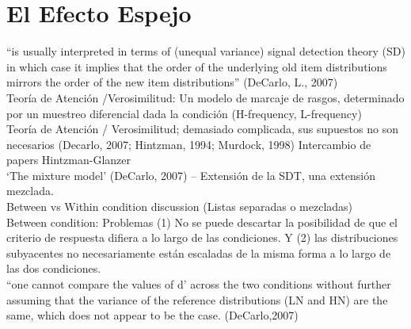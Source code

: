 
\section{El Efecto Espejo}

“is usually interpreted in terms of (unequal variance) signal detection theory (SD) in which case it implies that the order of the underlying old item distributions mirrors the order of the new item distributions” (DeCarlo, L.,  2007)\\
Teoría de Atención /Verosimilitud: Un modelo de marcaje de rasgos, determinado por un muestreo diferencial dada la condición (H-frequency, L-frequency)\\
Teoría de Atención / Verosimilitud; demasiado complicada, sus supuestos no son necesarios (Decarlo, 2007; Hintzman, 1994; Murdock, 1998) Intercambio de papers Hintzman-Glanzer\\
‘The mixture model’ (DeCarlo, 2007) – Extensión de la SDT, una extensión mezclada.\\
Between vs Within condition discussion (Listas separadas o mezcladas)\\
Between condition: Problemas (1) No se puede descartar la posibilidad de que el criterio de respuesta difiera a lo largo de las condiciones. Y (2) las distribuciones subyacentes no necesariamente están escaladas de la misma forma a lo largo de las dos condiciones.\\
“one cannot compare the values of d’ across the two conditions without further assuming that the variance of the reference distributions (LN and HN) are the same, which does not appear to be the case. (DeCarlo,2007)  
